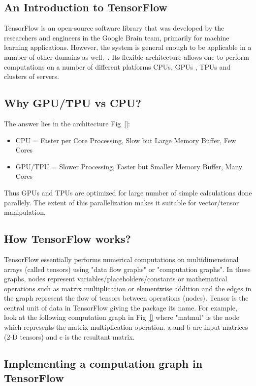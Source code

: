 \documentclass[10pt,letterpaper]{article}
\begin{document}
\subsection*{An Introduction to TensorFlow}

TensorFlow is an open-source software library that was developed by the researchers and engineers in the Google Brain team, primarily for machine learning applications. However, the system is general enough to be applicable in a number of other domains as well.~\cite{}.  Its flexible architecture allows one to perform computations on a number of different platforms \textemdash CPUs, GPUs , TPUs and clusters of servers. 

\subsection*{Why GPU/TPU vs CPU?}

The answer lies in the architecture Fig~\ref{}:  
\begin{itemize}
\item CPU = Faster per Core Processing, Slow but Large Memory Buffer, Few Cores
\item GPU/TPU = Slower Processing, Faster but Smaller Memory Buffer, Many Cores
\end{itemize}

Thus GPUs and TPUs are optimized for large number of simple calculations done parallely. The extent of this  parallelization makes it suitable for vector/tensor manipulation.

\subsection*{How TensorFlow works?}

TensorFlow essentially performs numerical computations on multidimensional arrays (called tensors) using "data flow graphs" or "computation graphs". In these graphs, nodes represent variables/placeholders/constants or mathematical operations such as matrix multiplication or elementwise addition and the edges in the graph represent the flow of tensors between operations (nodes). Tensor is the central unit of data in TensorFlow giving the package its name. For example, look at the following computation graph in Fig~\ref{} where "matmul" is the node which represents the matrix multiplication operation. a and b are input matrices (2-D tensors) and c is the resultant matrix.

\subsection*{Implementing a computation graph in TensorFlow}
\end{document}
